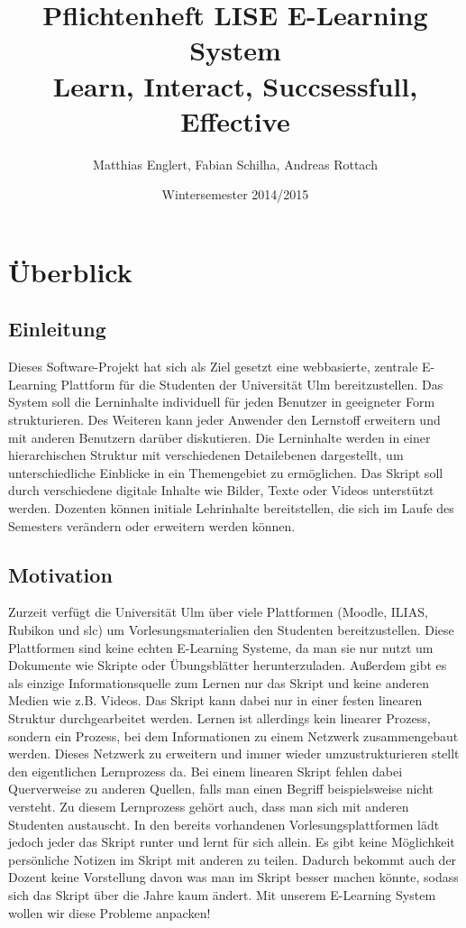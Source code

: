 \documentclass[12pt,a4paper]{article}
\title{Pflichtenheft LISE E-Learning System\\
		Learn, Interact, Succsessfull, Effective}
\author{Matthias Englert, Fabian Schilha, Andreas Rottach}
\date{Wintersemester 2014/2015}
\begin{document}
\maketitle
\newpage
\tableofcontents
\newpage
\section{Überblick}
\subsection{Einleitung}
Dieses Software-Projekt hat sich als Ziel gesetzt eine webbasierte, zentrale E-Learning Plattform für die Studenten der Universität Ulm bereitzustellen. Das System soll die Lerninhalte individuell für jeden Benutzer in geeigneter Form strukturieren. Des Weiteren kann jeder Anwender den Lernstoff erweitern und mit anderen Benutzern darüber diskutieren. Die Lerninhalte werden in einer hierarchischen Struktur mit verschiedenen Detailebenen dargestellt, um unterschiedliche Einblicke in ein Themengebiet zu ermöglichen. Das Skript soll durch verschiedene digitale Inhalte wie Bilder, Texte oder Videos unterstützt werden. Dozenten können initiale Lehrinhalte bereitstellen, die sich im Laufe des Semesters verändern oder erweitern werden können.

\subsection{Motivation}
Zurzeit verfügt die Universität Ulm über viele Plattformen (Moodle, ILIAS, Rubikon und slc) um Vorlesungsmaterialien den Studenten bereitzustellen. Diese Plattformen sind keine echten E-Learning Systeme, da man sie nur nutzt um Dokumente wie Skripte oder Übungsblätter herunterzuladen. Außerdem gibt es als einzige Informationsquelle zum Lernen nur das Skript und keine anderen Medien wie z.B. Videos. Das Skript kann dabei nur in einer festen linearen Struktur durchgearbeitet werden. Lernen ist allerdings kein linearer Prozess, sondern ein Prozess, bei dem Informationen zu einem Netzwerk zusammengebaut werden. Dieses Netzwerk zu erweitern und immer wieder umzustrukturieren stellt den eigentlichen Lernprozess da. Bei einem linearen Skript fehlen dabei Querverweise zu anderen Quellen, falls man einen Begriff beispielsweise nicht versteht. Zu diesem Lernprozess gehört auch, dass man sich mit anderen Studenten austauscht. In den bereits vorhandenen Vorlesungsplattformen lädt jedoch jeder das Skript runter und lernt für sich allein. Es gibt keine Möglichkeit persönliche Notizen im Skript mit anderen zu teilen. Dadurch bekommt auch der Dozent keine Vorstellung davon was man im Skript besser machen könnte, sodass sich das Skript über die Jahre kaum ändert.
Mit unserem E-Learning System wollen wir diese Probleme anpacken! 
\end{document}

